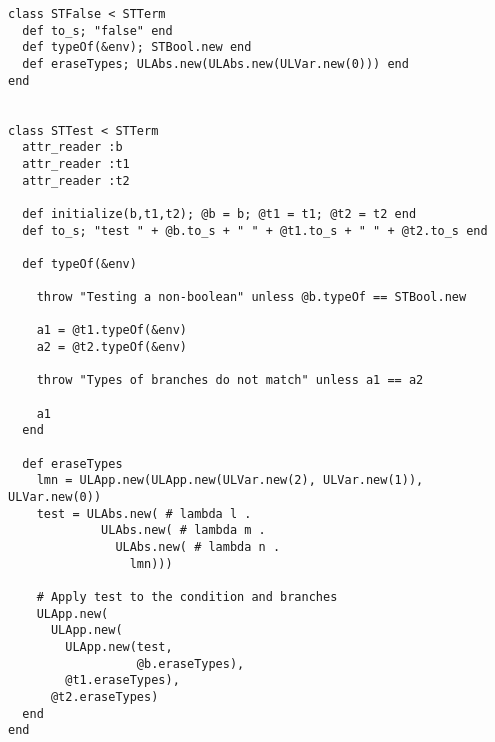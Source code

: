 \documentclass[11pt]{article}
\theoremstyle{definition}
\begin{document}
\begin{verbatim}
class STFalse < STTerm
  def to_s; "false" end
  def typeOf(&env); STBool.new end
  def eraseTypes; ULAbs.new(ULAbs.new(ULVar.new(0))) end
end


class STTest < STTerm
  attr_reader :b
  attr_reader :t1
  attr_reader :t2

  def initialize(b,t1,t2); @b = b; @t1 = t1; @t2 = t2 end
  def to_s; "test " + @b.to_s + " " + @t1.to_s + " " + @t2.to_s end

  def typeOf(&env)
    
    throw "Testing a non-boolean" unless @b.typeOf == STBool.new
    
    a1 = @t1.typeOf(&env)
    a2 = @t2.typeOf(&env)
    
    throw "Types of branches do not match" unless a1 == a2

    a1
  end

  def eraseTypes
    lmn = ULApp.new(ULApp.new(ULVar.new(2), ULVar.new(1)), ULVar.new(0))
    test = ULAbs.new( # lambda l .
             ULAbs.new( # lambda m .
               ULAbs.new( # lambda n .
                 lmn)))
    
    # Apply test to the condition and branches
    ULApp.new(
      ULApp.new(
        ULApp.new(test,
                  @b.eraseTypes),
        @t1.eraseTypes),
      @t2.eraseTypes)
  end
end
\end{verbatim}
\end{document}
